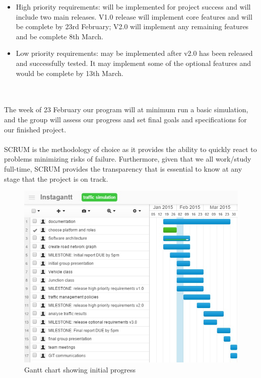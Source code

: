 \documentclass[11pt]{article}
\begin{document}
\begin{itemize}
    \item High priority requirements: will be implemented for project success and will include two main releases. V1.0 release will implement core features and will be complete by 23rd February; V2.0 will implement any remaining features and be complete 
8th March.

    \item Low priority requirements: may be implemented after v2.0 has been released and successfully tested. It may implement 
some of the optional features and would be complete by 13th March.
\end{itemize} 
\\ \\
The week of 23 February our program will at minimum run a basic simulation, and the group will assess our progress and set final goals and specifications for our finished project.
\\ \\ 
SCRUM is the methodology of choice as it provides the ability to quickly react to problems minimizing risks of failure. Furthermore, given that we all work/study full-time, SCRUM provides the transparency that is essential to know at any stage that the project is on track.


\begin{figure}[gantt8Feb]
	\includegraphics[scale=0.9]{gantt8Feb}
	\centering
	\caption{Gantt chart showing initial progress}
	\centering

\end{figure}
\end{document}
